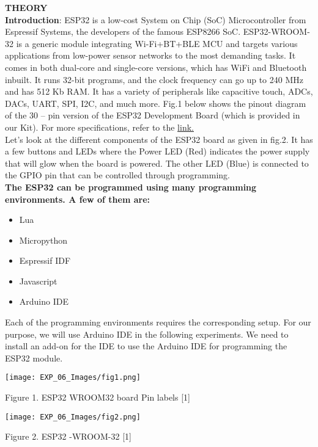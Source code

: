 \documentclass[12pt,a4paper]{article}
\begin{document}
\begin{justify}
\textbf{\large THEORY}\\[3pt]
\textbf{Introduction}: ESP32 is a low-cost System on Chip (SoC) Microcontroller from Espressif Systems, the developers of the famous ESP8266 SoC. ESP32-WROOM-32 is a generic module integrating Wi-Fi+BT+BLE MCU and targets various applications from low-power sensor networks to the most demanding tasks. It comes in both dual-core and single-core versions, which has WiFi and Bluetooth inbuilt. It runs 32-bit programs, and the clock frequency can go up to 240 MHz and has 512 Kb RAM. It has a variety of peripherals like capacitive touch, ADCs, DACs, UART, SPI, I2C, and much more. Fig.1 below shows the pinout diagram of the 30 – pin version of the ESP32 Development Board (which is provided in our Kit). For more specifications, refer to the \href{https://www.electronicshub.org/getting-started-with-esp32/}{link.}\\
Let’s look at the different components of the ESP32 board as given in fig.2. It has a few buttons and LEDs where the Power LED (Red) indicates the power supply that will glow when the board is powered. The other LED (Blue) is connected to the GPIO pin that can be controlled through programming.\\
\textbf{The ESP32 can be programmed using many programming environments. A few of them are:}\
\begin{itemize}
  \item Lua
  \item Micropython
  \item Espressif IDF
  \item Javascript
  \item Arduino IDE
\end{itemize}
\setlength{\parindent}{0eM}
Each of the programming environments requires the corresponding setup. For our purpose, we will use Arduino IDE in the following experiments. We need to install an add-on for the IDE to use the Arduino IDE for programming the ESP32 module.\end{justify}


\begin{center} 
\texttt{[image: EXP\_06\_Images/fig1.png]}
\end{center}
\begin{center} {Figure 1. ESP32 WROOM32 board Pin labels [1]}\end{center}
\begin{center} 
\texttt{[image: EXP\_06\_Images/fig2.png]}
\end{center}
\begin{center} {Figure 2. ESP32 -WROOM-32 [1]}\end{center}
\end{document}
